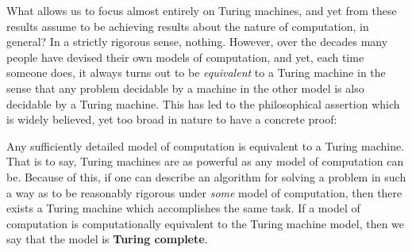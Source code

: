 \begin{comment}
 reason has to do with the palindrome problem, PAL.

What does this silly little problem have to do with Universal Turing machines? Well, what we've shown here is that our single string Turing machine is \textit{optimal} - it is the best possible algorithm to solve the problem. Thus, what it tells us isn't so much something about universal Turing machines, so much as something about the difference between multi-tape Turing machines and single-tape Turing machines.
\begin{corollary}
	The class of problems computable by single tape Turing machines in time $O(n)$ is \textit{properly} contained in as the class of problems computable by $k$-tape Turing machines in time $O(n)$. Multi-tape Turing machines offer definite improvements to efficiency, though it is limited to quadratic speedup, and even this is not guaranteed 
\end{corollary}
Thus, suppose there existed a single tape universal Turing machine which could simulate any other Turing machine in time $O(f(n))$, where $f(n)$ is the operating time of the simulated machine. 
\end{comment}
What allows us to focus almost entirely on Turing machines, and yet from these results assume to be achieving results about the nature of computation, in general? In a strictly rigorous sense, nothing. However, over the decades many people have devised their own models of computation, and yet, each time someone does, it always turns out to be \textit{equivalent} to a Turing machine in the sense that any problem decidable by a machine in the other model is also decidable by a Turing machine. This has led to the philosophical assertion which is widely believed, yet too broad in nature to have a concrete proof:
\begin{thesis}
    Any sufficiently detailed model of computation is equivalent to a Turing machine. That is to say, Turing machines are as powerful as any model of computation can be. Because of this, if one can describe an algorithm for solving a problem in such a way as to be reasonably rigorous under \textit{some} model of computation, then there exists a Turing machine which accomplishes the same task. If a model of computation is computationally equivalent to the Turing machine model, then we say that the model is \textbf{Turing complete}.
\end{thesis}

